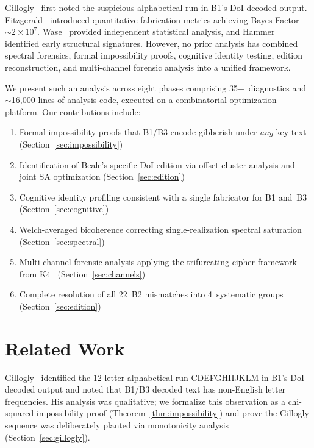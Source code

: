 \documentclass[11pt,a4paper]{article}
\begin{document}
Gillogly~\cite{gillogly1980} first noted the suspicious alphabetical run
in B1's DoI-decoded output. Fitzgerald~\cite{fitzgerald2024} introduced
quantitative fabrication metrics achieving Bayes Factor~$\sim 2 \times 10^7$.
Wase~\cite{wase2020} provided independent statistical analysis, and
Hammer~\cite{hammer1968} identified early structural signatures. However,
no prior analysis has combined spectral forensics, formal impossibility
proofs, cognitive identity testing, edition reconstruction, and
multi-channel forensic analysis into a unified framework.

We present such an analysis across eight phases comprising 35+~diagnostics
and $\sim$16{,}000 lines of analysis code, executed on a
combinatorial optimization platform. Our contributions include:

\begin{enumerate}[nosep]
    \item Formal impossibility proofs that B1/B3 encode gibberish under
          \emph{any} key text (Section~\ref{sec:impossibility})
    \item Identification of Beale's specific DoI edition via offset cluster
          analysis and joint SA optimization (Section~\ref{sec:edition})
    \item Cognitive identity profiling consistent with a single fabricator
          for B1 and~B3 (Section~\ref{sec:cognitive})
    \item Welch-averaged bicoherence correcting single-realization spectral
          saturation (Section~\ref{sec:spectral})
    \item Multi-channel forensic analysis applying the trifurcating cipher
          framework from K4~\cite{daugherty2026k4} (Section~\ref{sec:channels})
    \item Complete resolution of all 22~B2 mismatches into 4~systematic
          groups (Section~\ref{sec:edition})
\end{enumerate}

\section{Related Work}
\label{sec:related}

Gillogly~\cite{gillogly1980} identified the 12-letter alphabetical run
CDEFGHIIJKLM in B1's DoI-decoded output and noted that B1/B3 decoded
text has non-English letter frequencies. His analysis was qualitative;
we formalize this observation as a chi-squared impossibility proof
(Theorem~\ref{thm:impossibility}) and prove the Gillogly sequence was
deliberately planted via monotonicity analysis (Section~\ref{sec:gillogly}).
\end{document}
